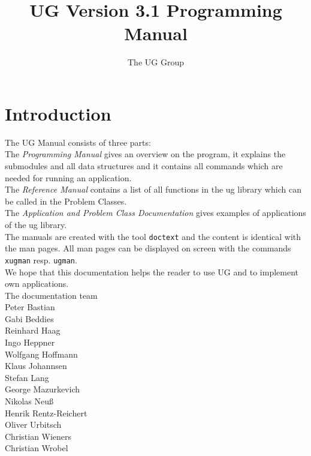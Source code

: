 


\pagestyle{myheadings}
\sloppy
\makeindex


\newcommand{\sectitle}{\mbox{}}
\setcounter{page}{0}

\title{UG Version 3.1 Programming Manual}
\author{The UG Group}

\maketitle


\section*{Introduction}

The UG Manual consists of three parts:
\\[5mm]  
The {\em Programming Manual} gives an overview on the program, it
explains the submodules and all data structures and it contains
all commands which are needed for running an application.
\\[5mm]  
The {\em Reference Manual} contains a list of all 
functions in the ug library which can be called in the Problem Classes.
\\[5mm]
The {\em Application and Problem Class Documentation} gives examples
of applications of the ug library.
\\[5mm]
The manuals are created with the tool {\tt doctext} and the content is 
identical with the man pages. All man pages can be displayed on screen 
with the commands {\tt xugman} resp. {\tt ugman}.
\\[5mm]
We hope that this documentation helps the reader to use UG 
and to implement own applications.
\\[1cm]
The documentation team
\\[1cm]
Peter Bastian\\
Gabi Beddies\\
Reinhard Haag\\
Ingo Heppner\\
Wolfgang Hoffmann\\
Klaus Johannsen\\
Stefan Lang\\
George Mazurkevich\\
Nikolas Neu\ss\\
Henrik Rentz-Reichert\\
Oliver Urbitsch\\
Christian Wieners\\
Christian Wrobel

